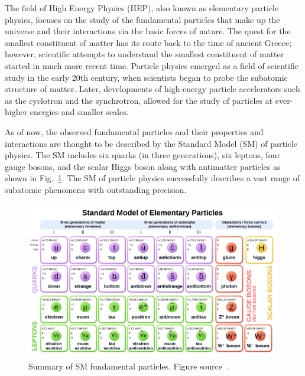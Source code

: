 

%
The field of High Energy Physics (HEP), also known as elementary particle physics,
focuses on the study of the fundamental particles that make up the universe and their interactions via the basic forces of nature.
%
The quest for the smallest constituent of matter has its route back to the time of ancient Greece;
however, scientific attempts to understand the smallest constituent of matter started in much more recent time.
%
Particle physics emerged as a field of scientific study in the early 20th century,
when scientists began to probe the subatomic structure of matter.
%
Later, developments
of high-energy particle accelerators such as the cyclotron and the synchrotron, allowed
for the study of particles at ever-higher energies and smaller scales.
%


%
%
As of now, the observed fundamental particles and their properties and interactions are thought to be described by the Standard Model (SM) of particle physics.
The SM includes six quarks (in three generations), six leptons, four gauge bosons, and the scalar Higgs boson along with antimatter particles as shown in Fig.~\ref{fig:SMParticles}.
The SM of particle physics successfully describes a vast range of subatomic phenomena with outstanding precision.

\begin{figure}[t!]
\centering
\includegraphics[width=0.99\textwidth]{figures/SMtable.png}
\caption[Summary of standard model fundamental particles]{Summary of SM fundamental particles. Figure source~\cite{SMtable}.
\label{fig:SMParticles}}
\end{figure}


